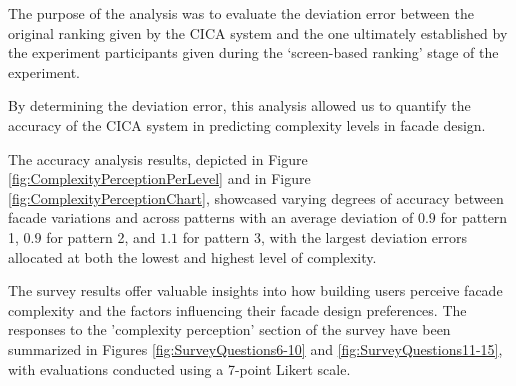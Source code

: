 The purpose of the analysis was to evaluate the deviation error between the original ranking given by the CICA system and the one ultimately established by the experiment participants given during the `screen-based ranking' stage of the experiment.

By determining the deviation error, this analysis allowed us to quantify the accuracy of the CICA system in predicting complexity levels in facade design.

The accuracy analysis results, depicted in Figure \ref{fig:ComplexityPerceptionPerLevel} and in Figure \ref{fig:ComplexityPerceptionChart}, showcased varying degrees of accuracy between facade variations and across patterns with an average deviation of \(0.9\) for pattern 1, \(0.9\) for pattern 2, and \(1.1\) for pattern 3, with the largest deviation errors allocated at both the lowest and highest level of complexity.


The survey results offer valuable insights into how building users perceive facade complexity and the factors influencing their facade design preferences.
The responses to the 'complexity perception' section of the survey have been summarized in Figures \ref{fig:SurveyQuestions6-10} and \ref{fig:SurveyQuestions11-15}, with evaluations conducted using a 7-point Likert scale.

